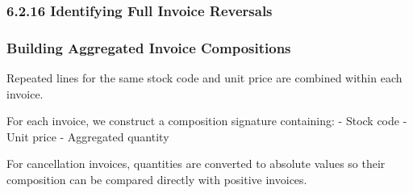 \documentclass[11pt]{article}
\begin{document}
    
    \subsubsection{6.2.16 Identifying Full Invoice
Reversals}\label{identifying-full-invoice-reversals}

    \subsubsection{Building Aggregated Invoice
Compositions}\label{building-aggregated-invoice-compositions}

Repeated lines for the same stock code and unit price are combined
within each invoice.

For each invoice, we construct a composition signature containing: -
Stock code - Unit price - Aggregated quantity

For cancellation invoices, quantities are converted to absolute values
so their composition can be compared directly with positive invoices.
\end{document}
